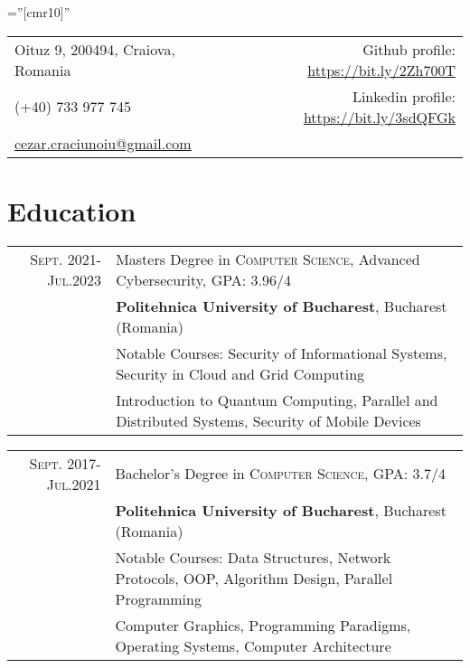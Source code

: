\documentclass[a4paper,10pt]{article}
\begin{document}
\pagestyle{empty}    %
\font\fb=''[cmr10]'' %


\begin{tabular}{lr}
    \footnotesize{Oituz 9, 200494, Craiova, Romania \hspace{225pt}} & \footnotesize{Github profile: \url{https://bit.ly/2Zh700T}} \\
    \footnotesize{(+40) 733 977 745} & \footnotesize{Linkedin profile: \url{https://bit.ly/3sdQFGk}} \\
    \footnotesize{\href{mailto:cezar.craciunoiu@gmail.com}{cezar.craciunoiu@gmail.com}} \\
\end{tabular}

\par{\bigskip\par}

\section{Education}
\begin{tabular}{rl}
	\textsc{Sept.} 2021-\textsc{Jul.}2023& Masters Degree in \textsc{Computer Science}, Advanced Cybersecurity, GPA: 3.96/4 \\&
	\normalsize\textbf{Politehnica University of Bucharest}, Bucharest (Romania) \\&
	\footnotesize{Notable Courses: Security of Informational Systems, Security in Cloud and Grid Computing} \\&
	\footnotesize{Introduction to Quantum Computing, Parallel and Distributed Systems, Security of Mobile Devices}
\end{tabular}

\begin{tabular}{rl}
	\textsc{Sept.} 2017-\textsc{Jul.}2021& Bachelor's Degree in \textsc{Computer Science}, GPA: 3.7/4 \\&
	\normalsize\textbf{Politehnica University of Bucharest}, Bucharest (Romania)\\&
	\footnotesize{Notable Courses: Data Structures, Network Protocols, OOP, Algorithm Design, Parallel Programming} \\&
	\footnotesize{Computer Graphics, Programming Paradigms, Operating Systems, Computer Architecture}
\end{tabular}
\end{document}
